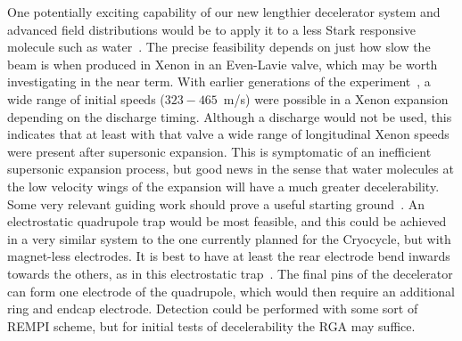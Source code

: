 One potentially exciting capability of our new lengthier decelerator system and advanced field distributions would be to apply it to a less Stark responsive molecule such as water~\citep[Sec.~2.4]{VanDeMeerakker2006thesis}.
The precise feasibility depends on just how slow the beam is when produced in Xenon in an Even-Lavie valve, which may be worth investigating in the near term.
With earlier generations of the experiment~\citep[Fig.~4]{Bochinski2004}, a wide range of initial speeds ($323-465$~m/s) were possible in a Xenon expansion depending on the discharge timing.
Although a discharge would not be used, this indicates that at least with that valve a wide range of longitudinal Xenon speeds were present after supersonic expansion.
This is symptomatic of an inefficient supersonic expansion process, but good news in the sense that water molecules at the low velocity wings of the expansion will have a much greater decelerability.
Some very relevant guiding work should prove a useful starting ground~\cite{Motsch2009}.
An electrostatic quadrupole trap would be most feasible, and this could be achieved in a very similar system to the one currently planned for the Cryocycle, but with magnet-less electrodes.
It is best to have at least the rear electrode bend inwards towards the others, as in this electrostatic trap~\cite{Veldhoven2006}.
The final pins of the decelerator can form one electrode of the quadrupole, which would then require an additional ring and endcap electrode.
Detection could be performed with some sort of REMPI scheme, but for initial tests of decelerability the RGA may suffice.

\ifx\justbeingincluded\undefined

\fi



